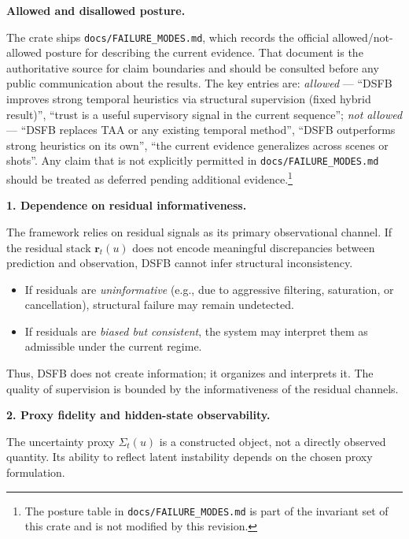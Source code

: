 \documentclass[11pt,letterpaper]{article}
\theoremstyle{gcresult}
\theoremstyle{definition}
\begin{document}
\vspace{0.5em}
\noindent
\textbf{Allowed and disallowed posture.}

The crate ships \texttt{docs/FAILURE\_MODES.md}, which records the official allowed/not-allowed posture for describing the current evidence. That document is the authoritative source for claim boundaries and should be consulted before any public communication about the results. The key entries are: \emph{allowed} --- ``DSFB improves strong temporal heuristics via structural supervision (fixed hybrid result)'', ``trust is a useful supervisory signal in the current sequence''; \emph{not allowed} --- ``DSFB replaces TAA or any existing temporal method'', ``DSFB outperforms strong heuristics on its own'', ``the current evidence generalizes across scenes or shots''. Any claim that is not explicitly permitted in \texttt{docs/FAILURE\_MODES.md} should be treated as deferred pending additional evidence.\footnote{The posture table in \texttt{docs/FAILURE\_MODES.md} is part of the invariant set of this crate and is not modified by this revision.}

\vspace{0.5em}
\noindent
\textbf{1. Dependence on residual informativeness.}

The framework relies on residual signals as its primary observational channel. If the residual stack $\mathbf{r}_t(u)$ does not encode meaningful discrepancies between prediction and observation, DSFB cannot infer structural inconsistency.

\begin{itemize}[leftmargin=1.5em]
    \item If residuals are \emph{uninformative} (e.g., due to aggressive filtering, saturation, or cancellation), structural failure may remain undetected.
    \item If residuals are \emph{biased but consistent}, the system may interpret them as admissible under the current regime.
\end{itemize}

Thus, DSFB does not create information; it organizes and interprets it. The quality of supervision is bounded by the informativeness of the residual channels.

\vspace{0.5em}
\noindent
\textbf{2. Proxy fidelity and hidden-state observability.}

The uncertainty proxy $\Sigma_t(u)$ is a constructed object, not a directly observed quantity. Its ability to reflect latent instability depends on the chosen proxy formulation.
\end{document}
